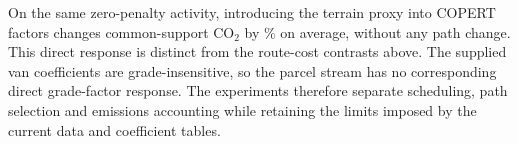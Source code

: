 On the same zero-penalty activity, introducing the terrain proxy into COPERT
factors changes common-support CO$_2$ by \DirectGradeCo\% on average, without
any path change. This direct response is distinct from the route-cost contrasts
above. The supplied van coefficients are grade-insensitive, so the parcel
stream has no corresponding direct grade-factor response. The experiments
therefore separate scheduling, path selection and emissions accounting while
retaining the limits imposed by the current data and coefficient tables.
